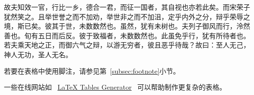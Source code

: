 故夫知效一官，行比一乡，德合一君，而征一国者，其自视也亦若此矣。而宋荣子
犹然笑之。且举世誉之而不加劝，举世非之而不加沮，定乎内外之分，辩乎荣辱之
境，斯已矣。彼其于世，未数数然也。虽然，犹有未树也。夫列子御风而行，泠然
善也。旬有五日而后反。彼于致福者，未数数然也。此虽免乎行，犹有所待者也。
若夫乘天地之正，而御六气之辩，以游无穷者，彼且恶乎待哉？故曰：至人无己，
神人无功，圣人无名。

若要在表格中使用脚注，请参见第~\ref{subsec:footnote}小节。

一些在线网站如
~\href{http://www.tablesgenerator.com}{LaTeX Tables Generator}~
可以帮助制作更复杂的表格。
